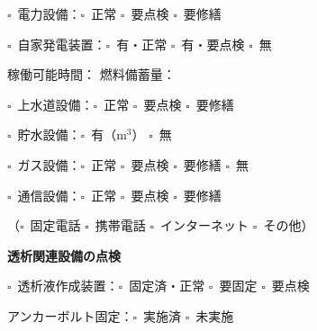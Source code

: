 \documentclass[a4paper,12pt]{jarticle}
\newcommand{\checkbox}{$\square$\ }
\newcommand{\underlinespace}[1]{\underline{\hspace{#1}}}
\begin{document}
\vspace{3mm}

\noindent
\checkbox 電力設備：\checkbox 正常 \quad \checkbox 要点検 \quad \checkbox 要修繕

\vspace{2mm}

\noindent
\checkbox 自家発電装置：\checkbox 有・正常 \quad \checkbox 有・要点検 \quad \checkbox 無

\vspace{2mm}

\noindent
稼働可能時間：\underlinespace{3cm} \quad 燃料備蓄量：\underlinespace{3cm}

\vspace{3mm}

\noindent
\checkbox 上水道設備：\checkbox 正常 \quad \checkbox 要点検 \quad \checkbox 要修繕

\vspace{2mm}

\noindent
\checkbox 貯水設備：\checkbox 有（\underlinespace{2cm}m$^3$） \quad \checkbox 無

\vspace{3mm}

\noindent
\checkbox ガス設備：\checkbox 正常 \quad \checkbox 要点検 \quad \checkbox 要修繕 \quad \checkbox 無

\vspace{3mm}

\noindent
\checkbox 通信設備：\checkbox 正常 \quad \checkbox 要点検 \quad \checkbox 要修繕

\vspace{2mm}

\noindent
（\checkbox 固定電話 \quad \checkbox 携帯電話 \quad \checkbox インターネット \quad \checkbox その他）

\vspace{8mm}

\begin{center}
\textbf{\large 透析関連設備の点検}
\end{center}

\vspace{3mm}

\noindent
\checkbox 透析液作成装置：\checkbox 固定済・正常 \quad \checkbox 要固定 \quad \checkbox 要点検

\vspace{2mm}

\noindent
アンカーボルト固定：\checkbox 実施済 \quad \checkbox 未実施

\vspace{3mm}
\end{document}

